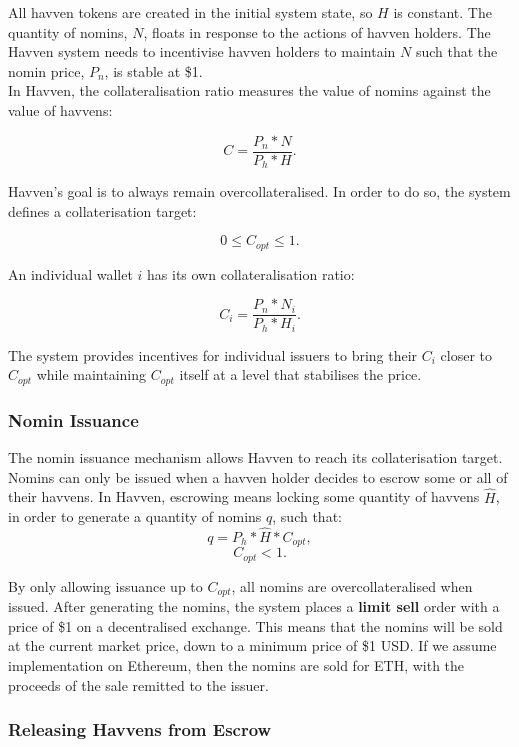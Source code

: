 \noindent All havven tokens are created in the initial system state, so $H$ is constant. The quantity of nomins, $N$, floats in response to the actions of havven holders. The Havven system needs to incentivise havven holders to maintain $N$ such that the nomin price, $P_n$, is stable at \$1. \\

\noindent In Havven, the collateralisation ratio measures the value of nomins against the value of havvens:

$$ C = \frac{P_n * N}{P_h * H}. $$

\noindent Havven's goal is to always remain overcollateralised. In order to do so, the system defines a collaterisation target:

$$ 0 \leq C_{opt} \leq 1. $$

\noindent An individual wallet $i$ has its own collateralisation ratio:

$$ C_i = \frac{P_n * N_i}{P_h * H_i}. $$

\noindent The system provides incentives for individual issuers to bring their $C_i$ closer to $C_{opt}$ while maintaining $C_{opt}$ itself at a level that stabilises the price.

\subsubsection{Nomin Issuance}

\noindent The nomin issuance mechanism allows Havven to reach its collaterisation target. Nomins can only be issued when a havven holder decides to escrow some or all of their havvens. In Havven, escrowing means locking some quantity of havvens $\hat{H}$, in order to generate a quantity of nomins $q$, such that:
$$ q = P_h * \hat{H} * C_{opt}, $$
$$ C_{opt} < 1. $$

\noindent By only allowing issuance up to $C_{opt}$, all nomins are overcollateralised when issued. After generating the nomins, the system places a \textbf{limit sell} order with a price of \$1 on a decentralised exchange. This means that the nomins will be sold at the current market price, down to a minimum price of \$1 USD. If we assume implementation on Ethereum, then the nomins are sold for ETH, with the proceeds of the sale remitted to the issuer. \\

\subsubsection{Releasing Havvens from Escrow}

